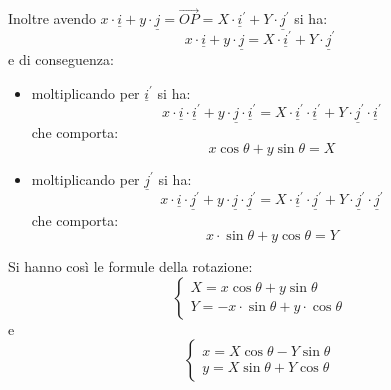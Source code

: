 \documentclass[a4paper,12pt, oneside]{book}
\begin{document}
Inoltre avendo $x\cdot \underline{i}+y\cdot \underline{j}=\vec{OP}=X\cdot \underline{i}^{'}+Y\cdot \underline{j}^{'}$ si ha:
$$x\cdot \underline{i}+y\cdot \underline{j}=X\cdot \underline{i}^{'}+Y\cdot \underline{j}^{'}$$
e di conseguenza:
\begin{itemize}
\item moltiplicando per $\underline{i}^{'}$ si ha:
$$x\cdot \underline{i}\cdot \underline{i}^{'}+y\cdot \underline{j}\cdot \underline{i}^{'}=X\cdot \underline{i}^{'}\cdot \underline{i}^{'}+Y\cdot \underline{j}^{'}\cdot \underline{i}^{'}$$
che comporta:
$$x\cos \theta+y\sin\theta=X$$
\item moltiplicando per $\underline{j}^{'}$ si ha:
$$x\cdot \underline{i}\cdot \underline{j}^{'}+y\cdot \underline{j}\cdot \underline{j}^{'}=X\cdot \underline{i}^{'}\cdot \underline{j}^{'}+Y\cdot \underline{j}^{'}\cdot \underline{j}^{'}$$
che comporta:
$$x\cdot \sin\theta+y\cos\theta=Y$$
\end{itemize}
Si hanno così le formule della rotazione:
$$\begin{cases}
X=x\cos \theta +y\sin\theta\\
Y=-x\cdot\sin\theta+y\cdot \cos\theta
\end{cases}$$
e
$$\begin{cases}
x=X\cos\theta-Y\sin\theta\\
y=X\sin\theta+Y\cos\theta
\end{cases}
$$
\end{document}
